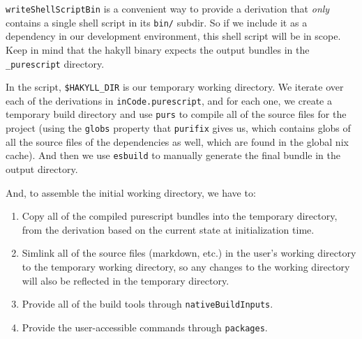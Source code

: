 \documentclass[]{article}
\begin{document}
\texttt{writeShellScriptBin} is a convenient way to provide a derivation that
\emph{only} contains a single shell script in its \texttt{bin/} subdir. So if we
include it as a dependency in our development environment, this shell script
will be in scope. Keep in mind that the hakyll binary expects the output bundles
in the \texttt{\_purescript} directory.

In the script, \texttt{\$HAKYLL\_DIR} is our temporary working directory. We
iterate over each of the derivations in \texttt{inCode.purescript}, and for each
one, we create a temporary build directory and use \texttt{purs} to compile all
of the source files for the project (using the \texttt{globs} property that
\texttt{purifix} gives us, which contains globs of all the source files of the
dependencies as well, which are found in the global nix cache). And then we use
\texttt{esbuild} to manually generate the final bundle in the output directory.

And, to assemble the initial working directory, we have to:

\begin{enumerate}
\def\labelenumi{\arabic{enumi}.}
\tightlist
\item
  Copy all of the compiled purescript bundles into the temporary directory, from
  the derivation based on the current state at initialization time.
\item
  Simlink all of the source files (markdown, etc.) in the user's working
  directory to the temporary working directory, so any changes to the working
  directory will also be reflected in the temporary directory.
\item
  Provide all of the build tools through \texttt{nativeBuildInputs}.
\item
  Provide the user-accessible commands through \texttt{packages}.
\end{enumerate}
\end{document}
